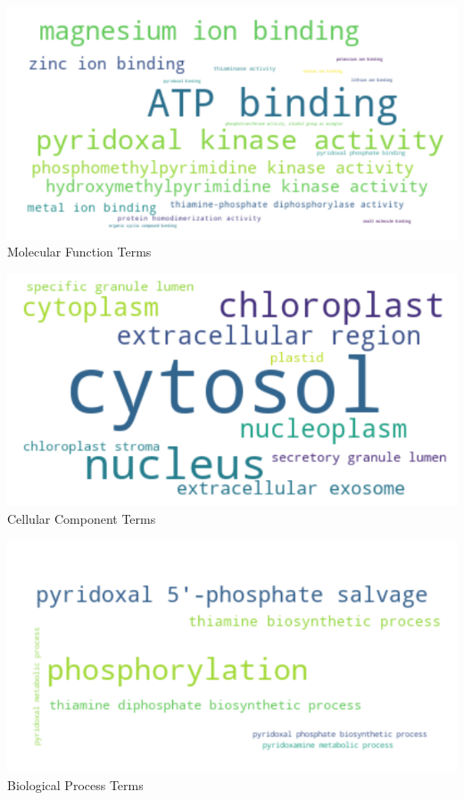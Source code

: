 \documentclass[10pt,twocolumn,letterpaper]{article}
\begin{document}
\begin{center}
    \includegraphics[scale=0.35]{report/img/word_cloud_mf.png} \\
    \small{Molecular Function Terms}
\end{center}

\begin{center}
    \includegraphics[scale=0.35]{report/img/word_cloud_cc.png} \\
    \small{Cellular Component Terms}
\end{center}

\begin{center}
    \includegraphics[scale=0.35]{report/img/word_cloud_bp.png} \\
    \small{Biological Process Terms}
\end{center} \\
\end{document}
